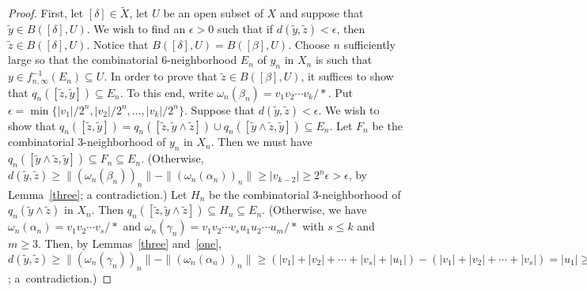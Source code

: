 \documentclass{amsart}
\theoremstyle{definition}
\theoremstyle{remark}
\numberwithin{equation}{section}
\begin{document}
\begin{proof}
  First, let $[\delta]\in \tilde{X}$, let $U$ be an open subset of $X$ and suppose that $\tilde{y}\in B([\delta],U)$.  We wish to find an $\epsilon>0$ such that if $d(\tilde{y},\tilde{z})<\epsilon$, then $\tilde{z}\in B([\delta],U)$. Notice that $B([\delta],U)=B([\beta],U)$. Choose $n$ sufficiently large so that the combinatorial 6\nobreakdash-neighborhood $E_n$ of $y_n$ in $X_n$ is such that  $y\in f^{-1}_{n,\infty}(E_n)\subseteq U$.
   In order to prove that $\tilde{z}\in B([\beta],U)$, it suffices to show that $q_n([\tilde{z},\tilde{y}])\subseteq E_n$.
 To this end, write $\omega_n(\beta_n)=v_1v_2\cdots v_k/\ast$. Put $\epsilon=\min\{|v_1|/2^n,|v_2|/2^n,\dots,|v_k|/2^n\}$. Suppose that $d(\tilde{y},\tilde{z})<\epsilon$. We wish to show that $q_n([\tilde{z},\tilde{y}])=q_n([\tilde{z},\tilde{y}\wedge\tilde{z}])\cup q_n([\tilde{y}\wedge\tilde{z},\tilde{y}])\subseteq E_n$. Let $F_n$ be the combinatorial 3-neighborhood of $y_n$ in $X_n$. Then   we must have $q_n([\tilde{y}\wedge\tilde{z},\tilde{y}])\subseteq F_n\subseteq E_n$. (Otherwise,  $d(\tilde{y},\tilde{z})\geqslant \|(\omega_n(\beta_n))_n\|-\|(\omega_n(\alpha_n))_n\|\geqslant |v_{k-2}|\geqslant 2^n\epsilon>\epsilon$, by Lemma~\ref{three}; a contradiction.) Let $H_n$ be the combinatorial 3-neighborhood of $q_n(\tilde{y}\wedge \tilde{z})$ in $X_n$. Then  $q_n([\tilde{z},\tilde{y}\wedge\tilde{z}])\subseteq H_n\subseteq E_n$. (Otherwise, we have $\omega_n(\alpha_n)=v_1v_2\cdots v_s/\ast$ and $\omega_n(\gamma_n)=v_1v_2\cdots v_su_1u_2\cdots u_m/\ast$ with $s\leqslant k$ and $m\geqslant 3$. Then, by Lemmas~\ref{three} and~\ref{one}, $d(\tilde{y},\tilde{z})\geqslant \|(\omega_n(\gamma_n))_n\|-\|(\omega_n(\alpha_n))_n\|\geqslant\left(|v_1|+|v_2|+\cdots + |v_s|+|u_1|\right)-\left(|v_1|+|v_2|+\cdots+|v_s|\right)= |u_1|\geqslant |v_s|/2^n\geqslant \epsilon$; a~contradiction.)


\end{proof}
\end{document}
